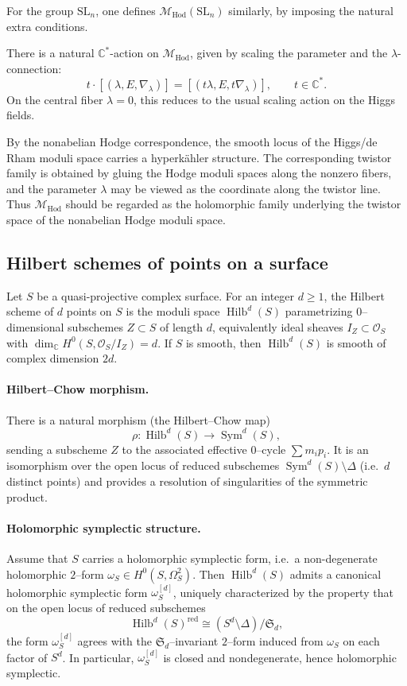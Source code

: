 \documentclass[twoside, 11pt]{article}
\numberwithin{equation}{section}
\theoremstyle{theorem}
\numberwithin{theorem}{section}
\theoremstyle{definition}
\begin{document}
For the group \(\mathrm{SL}_n\), one defines \(\mathcal{M}_{\mathrm{Hod}}(\mathrm{SL}_n)\) similarly, by imposing the natural extra conditions.

There is a natural \(\mathbb C^\ast\)-action on \(\mathcal{M}_{\mathrm{Hod}}\), given by scaling the parameter and the \(\lambda\)-connection:
\[
t\cdot [(\lambda,E,\nabla_\lambda)]
=
[(t\lambda,E,t\nabla_\lambda)],
\qquad t\in \mathbb C^\ast.
\]
On the central fiber \(\lambda=0\), this reduces to the usual scaling action on the Higgs fields.

By the nonabelian Hodge correspondence, the smooth locus of the Higgs/de Rham moduli space carries a hyperk\"ahler structure. The corresponding twistor family is obtained by gluing the Hodge moduli spaces along the nonzero fibers, and the parameter \(\lambda\) may be viewed as the coordinate along the twistor line. Thus \(\mathcal{M}_{\mathrm{Hod}}\) should be regarded as the holomorphic family underlying the twistor space of the nonabelian Hodge moduli space.


\subsection{Hilbert schemes of points on a surface}
\label{s:hilb-surface}

Let $S$ be a quasi-projective complex surface. For an integer $d\ge 1$, the Hilbert scheme of $d$ points on $S$ is the moduli space
\(
\operatorname{Hilb}^d(S)
\)
parametrizing $0$--dimensional subschemes $Z\subset S$ of length $d$, equivalently ideal sheaves $I_Z\subset \mathcal{O}_S$ with
\(\dim_{\mathbb{C}} H^0(S,\mathcal{O}_S/I_Z)=d\).
If $S$ is smooth, then $\operatorname{Hilb}^d(S)$ is smooth of complex dimension $2d$. 

\paragraph{Hilbert--Chow morphism.}
There is a natural morphism (the Hilbert--Chow map)
\[
\rho:\operatorname{Hilb}^d(S)\longrightarrow \operatorname{Sym}^d(S),
\]
sending a subscheme $Z$ to the associated effective $0$--cycle $\sum m_i p_i$. It is an isomorphism over the open locus of reduced subschemes $\operatorname{Sym}^d(S)\setminus \Delta$ (i.e.\ $d$ distinct points) and provides a resolution of singularities of the symmetric product.


\paragraph{Holomorphic symplectic structure.}
Assume that $S$ carries a holomorphic symplectic form, i.e.\ a non-degenerate holomorphic $2$--form
\(\omega_S\in H^0(S,\Omega_S^2)\).
Then $\operatorname{Hilb}^d(S)$ admits a canonical holomorphic symplectic form $\omega_S^{[d]}$, uniquely characterized by the property that on the open locus of reduced subschemes
\[
\operatorname{Hilb}^d(S)^{\mathrm{red}}\cong (S^d\setminus \Delta)/\mathfrak{S}_d,
\]
the form $\omega_S^{[d]}$ agrees with the $\mathfrak{S}_d$--invariant $2$--form induced from $\omega_S$ on each factor of $S^d$. In particular, $\omega_S^{[d]}$ is closed and nondegenerate, hence holomorphic symplectic.
\end{document}
